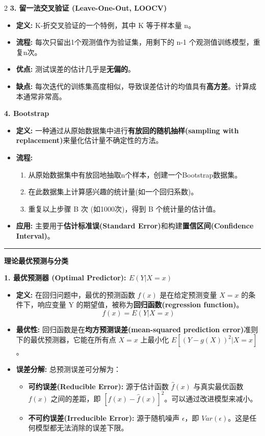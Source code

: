 \documentclass[9pt,a4paper]{article} %
\newcommand{\mysection}[1]{\vspace{0.5em}\hrule\vspace{0.3em}\noindent\textbf{\large #1}\vspace{0.1em}}
\begin{document}
\begin{multicols}{2}
\textbf{3. 留一法交叉验证 (Leave-One-Out, LOOCV)}
\begin{itemize}
    \item \textbf{定义:} K-折交叉验证的一个特例，其中 K 等于样本量 n。
    \item \textbf{流程:} 每次只留出1个观测值作为验证集，用剩下的 n-1 个观测值训练模型，重复n次。
    \item \textbf{优点:} 测试误差的估计几乎是\textbf{无偏的}。
    \item \textbf{缺点:} 每次迭代的训练集高度相似，导致误差估计的均值具有\textbf{高方差}。计算成本通常非常高。
\end{itemize}

\textbf{4. Bootstrap}
\begin{itemize}
    \item \textbf{定义:} 一种通过从原始数据集中进行\textbf{有放回的随机抽样(sampling with replacement)}来量化估计量不确定性的方法。
    \item \textbf{流程:}
        \begin{enumerate}
            \item 从原始数据集中有放回地抽取n个样本，创建一个Bootstrap数据集。
            \item 在此数据集上计算感兴趣的统计量(如一个回归系数)。
            \item 重复以上步骤 B 次 (如1000次)，得到 B 个统计量的估计值。
        \end{enumerate}
    \item \textbf{应用:} 主要用于\textbf{估计标准误(Standard Error)}和构建\textbf{置信区间(Confidence Interval)}。
\end{itemize}






\mysection{理论最优预测与分类}

\textbf{1. 最优预测器 (Optimal Predictor): $E(Y|X=x)$}
\begin{itemize}
    \item \textbf{定义:} 在回归问题中，最优的预测函数 $f(x)$ 是在给定预测变量 $X=x$ 的条件下，响应变量 Y 的期望值，被称为\textbf{回归函数(regression function)}。
    $$ f(x) = E(Y|X=x) $$
    \item \textbf{最优性:} 回归函数是在\textbf{均方预测误差(mean-squared prediction error)}准则下的最优预测器，它能在所有点 $X=x$ 上最小化 $E[(Y-g(X))^2|X=x]$。
    \item \textbf{误差分解:} 总预测误差可分解为：
        \begin{itemize}
            \item \textbf{可约误差(Reducible Error):} 源于估计函数 $\hat{f}(x)$ 与真实最优函数 $f(x)$ 之间的差距，即 $[f(x) - \hat{f}(x)]^2$。可以通过改进模型来减小。
            \item \textbf{不可约误差(Irreducible Error):} 源于随机噪声 $\epsilon$，即 $Var(\epsilon)$。这是任何模型都无法消除的误差下限。
        \end{itemize}
\end{itemize}


\end{multicols}
\end{document}

